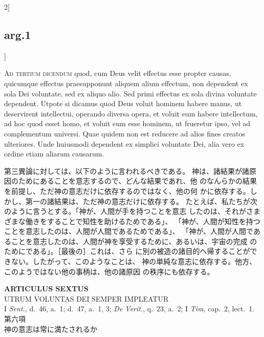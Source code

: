 \documentclass[paper=a4paper,fontsize=10pt,jafontsize=9pt,titlepage]{jlreq}
\begin{document}
\begin{paracol}{2}[\subsection{arg.1}]
\switchcolumn*[\subsection{ad.3}]


{\scshape Ad tertium dicendum} quod, cum Deus velit
effectus esse propter causas, quicumque effectus praesupponunt aliquem
alium effectum, non dependent ex sola Dei voluntate, sed ex aliquo
alio. Sed primi effectus ex sola divina voluntate dependent. Utpote si
dicamus quod Deus voluit hominem habere manus, ut deservirent
intellectui, operando diversa opera, et voluit eum habere intellectum,
ad hoc quod esset homo, et voluit eum esse hominem, ut frueretur ipso,
vel ad complementum universi. Quae quidem non est reducere ad alios
fines creatos ulteriores. Unde huiusmodi dependent ex simplici voluntate
Dei, alia vero ex ordine etiam aliarum causarum.

\switchcolumn

第三異論に対しては、以下のように言われるべきである。
神は、諸結果が諸原因のためにあることを意志するので、どんな結果であれ、他
 のなんらかの結果を前提し、ただ神の意志だけに依存するのではなく、他の何
 かに依存する。しかし、第一の諸結果は、ただ神の意志だけに依存する。
たとえば、私たちが次のように言うとする。「神が、人間が手を持つことを意志
 したのは、それがさまざまな働きをすることで知性を助けるためである」、
 「神が、人間が知性を持つことを意志したのは、人間が人間であるためである」、
 「神が、人間が人間であることを意志したのは、人間が神を享受するために、あるいは、宇宙の完成
 のためにである」。［最後の］これは、さら
 に別の被造の諸目的へ帰することができない。したがって、このようなことは、
 神の単純な意志に依存する。他方、このようではない他の事柄は、他の諸原因
 の秩序にも依存する。

\end{paracol}
\newpage


{}
\setcounter{section}{6}
\setcounter{subsection}{0}
\begin{center}
 {\Large {\bfseries ARTICULUS SEXTUS}}\\
 {\large UTRUM VOLUNTAS DEI SEMPER IMPLEATUR}\\
 {\footnotesize I {\itshape Sent.}, d.~46, a.~1; d.~47, a.~1, 3;
 {\itshape De Verit.}, q.~23, a.~2; I {\itshape Tim}, cap.~2, lect.~1.}\\
 {\Large 第六項\\神の意志は常に満たされるか}
\end{center}
\end{document}
